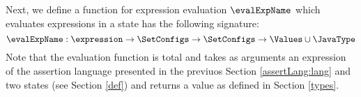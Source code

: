 
 



Next, we define a function for expression evaluation
 $\evalExpName$ which evaluates expressions in a state has the following signature:
$$
\evalExpName : \expression \rightarrow \SetConfigs  \rightarrow \SetConfigs  \rightarrow  \Values \cup \JavaType
$$
Note that the evaluation function is total and  takes as arguments an expression of the assertion language presented in the previuos Section 
\ref{assertLang:lang} and two states (see Section \ref{def})  and returns a value as defined in Section \ref{types}.








